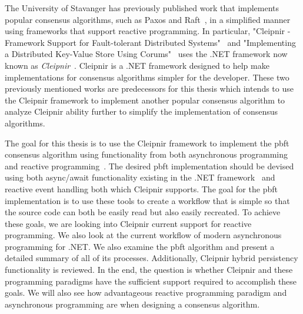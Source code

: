 The University of Stavanger has previously published work that implements popular consensus algorithms, such as Paxos and Raft~\cite{WEB:ConsesAlgo}, in a simplified manner using frameworks that support reactive programming. In particular, "Cleipnir - Framework Support for Fault-tolerant Distributed Systems"~\cite{PAPER:PaxosCleipnir} and "Implementing a Distributed Key-Value Store Using Corums"~\cite{PAPER:EivindPaper} uses the .NET framework now known as \textit{Cleipnir}~\cite{DOC:Cleipnir}.
Cleipnir is a .NET framework designed to help make implementations for consensus algorithms simpler for the developer.
These two previously mentioned works are predecessors for this thesis which intends to use the Cleipnir framework to implement another popular consensus algorithm to analyze Cleipnir ability further to simplify the implementation of consensus algorithms.

The goal for this thesis is to use the Cleipnir framework to implement the \acl{pbft} consensus algorithm using functionality from both asynchronous programming and reactive programming~\cite{WEB:pbftmast}. The desired \ac{pbft} implementation should be devised using both async/await functionality existing in the .NET framework~\cite{DOC:AsyncAwait} and reactive event handling both which Cleipnir supports. The goal for the \ac{pbft} implementation is to use these tools to create a workflow that is simple so that the source code can both be easily read but also easily recreated. To achieve these goals, we are looking into Cleipnir current support for reactive programming. We also look at the current workflow of modern asynchronous programming for .NET. We also examine the \ac{pbft} algorithm and present a detailed summary of all of its processes. Additionally, Cleipnir hybrid persistency functionality is reviewed.
In the end, the question is whether Cleipnir and these programming paradigms have the sufficient support required to accomplish these goals. We will also see how advantageous reactive programming paradigm and asynchronous programming are when designing a consensus algorithm.
